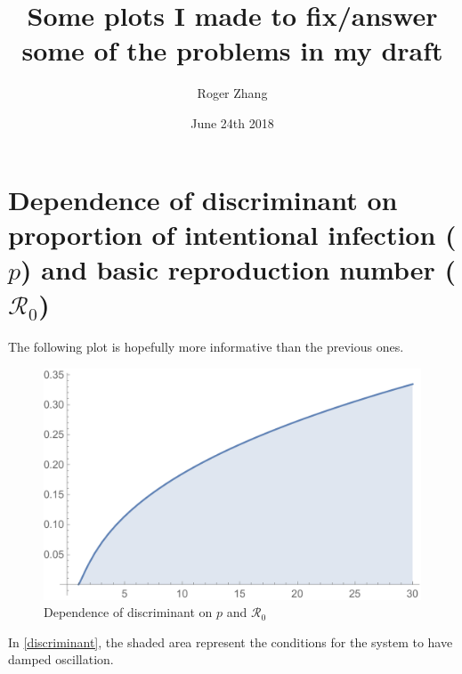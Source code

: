 \documentclass[12pt]{article}
\title{Some plots I made to fix/answer some of the problems in my draft}
\author{Roger Zhang}
\date{June 24th 2018}
\newcommand{\R}{\mathcal{R}}
\begin{document}
\maketitle
\clearpage
\section{Dependence of discriminant on proportion of intentional infection ($p$) and basic reproduction number ($\R_0$)}

The following plot is hopefully more informative than the previous ones.
\begin{figure}[H]
  \caption{Dependence of discriminant on $p$ and $\R_0$}
  \centering
  \includegraphics[width=1\textwidth]{Figures/Discriminant_dependence.pdf}
\end{figure}\label{discriminant}
In \autoref{discriminant}, the shaded area represent the conditions for the system to have damped oscillation.
\clearpage
\end{document}
